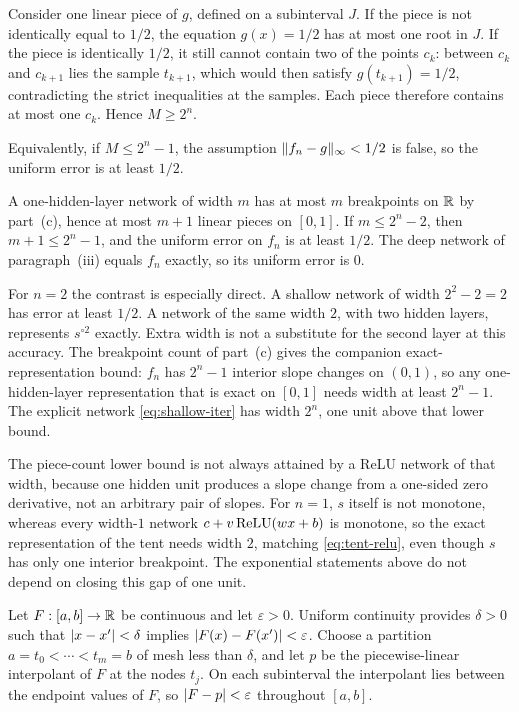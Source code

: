 Consider one linear piece of \(g\), defined on a subinterval \(J\). If the piece is not identically equal to \(1/2\), the equation \(g(x)=1/2\) has at most one root in \(J\). If the piece is identically \(1/2\), it still cannot contain two of the points \(c_k\): between \(c_k\) and \(c_{k+1}\) lies the sample \(t_{k+1}\), which would then satisfy \(g(t_{k+1})=1/2\), contradicting the strict inequalities at the samples. Each piece therefore contains at most one \(c_k\). Hence \(M\ge 2^n\).

Equivalently, if \(M\le 2^n-1\), the assumption \(\lVert f_n-g\rVert_\infty<1/2\) is false, so the uniform error is at least \(1/2\).

A one-hidden-layer network of width \(m\) has at most \(m\) breakpoints on \(\mathbb{R}\) by part~(c), hence at most \(m+1\) linear pieces on \([0,1]\). If \(m\le 2^n-2\), then \(m+1\le 2^n-1\), and the uniform error on \(f_n\) is at least \(1/2\). The deep network of paragraph~(iii) equals \(f_n\) exactly, so its uniform error is \(0\).

For \(n=2\) the contrast is especially direct. A shallow network of width \(2^2-2=2\) has error at least \(1/2\). A network of the same width \(2\), with two hidden layers, represents \(s^{\circ 2}\) exactly. Extra width is not a substitute for the second layer at this accuracy. The breakpoint count of part~(c) gives the companion exact-representation bound: \(f_n\) has \(2^n-1\) interior slope changes on \((0,1)\), so any one-hidden-layer representation that is exact on \([0,1]\) needs width at least \(2^n-1\). The explicit network \eqref{eq:shallow-iter} has width \(2^n\), one unit above that lower bound.

\begin{remark}
The piece-count lower bound is not always attained by a ReLU network of that width, because one hidden unit produces a slope change from a one-sided zero derivative, not an arbitrary pair of slopes. For \(n=1\), \(s\) itself is not monotone, whereas every width-\(1\) network \(c+v\operatorname{ReLU}(wx+b)\) is monotone, so the exact representation of the tent needs width \(2\), matching \eqref{eq:tent-relu}, even though \(s\) has only one interior breakpoint. The exponential statements above do not depend on closing this gap of one unit.
\end{remark}


Let \(F:[a,b]\to\mathbb{R}\) be continuous and let \(\varepsilon>0\). Uniform continuity provides \(\delta>0\) such that \(\lvert x-x'\rvert<\delta\) implies \(\lvert F(x)-F(x')\rvert<\varepsilon\). Choose a partition \(a=t_0<\cdots<t_m=b\) of mesh less than \(\delta\), and let \(p\) be the piecewise-linear interpolant of \(F\) at the nodes \(t_j\). On each subinterval the interpolant lies between the endpoint values of \(F\), so \(\lvert F-p\rvert<\varepsilon\) throughout \([a,b]\).

